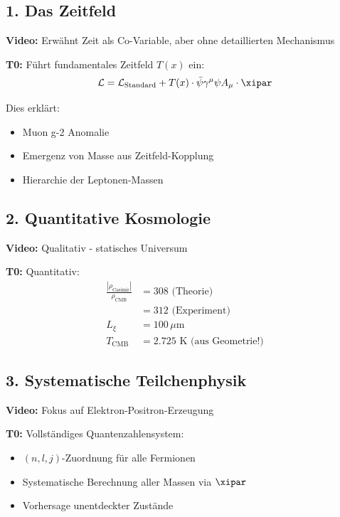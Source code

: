 	\subsection{1. Das Zeitfeld}
	
	\textbf{Video:} Erwähnt Zeit als Co-Variable, aber ohne detaillierten Mechanismus
	
	\textbf{T0:} Führt fundamentales Zeitfeld $T(x)$ ein:
	\begin{equation}
		\mathcal{L} = \mathcal{L}_{\text{Standard}} + T(x) \cdot \bar{\psi}\gamma^\mu\psi A_\mu \cdot \xipar
	\end{equation}
	
	Dies erklärt:
	\begin{itemize}
		\item Muon g-2 Anomalie
		\item Emergenz von Masse aus Zeitfeld-Kopplung
		\item Hierarchie der Leptonen-Massen
	\end{itemize}
	
	\subsection{2. Quantitative Kosmologie}
	
	\textbf{Video:} Qualitativ - statisches Universum
	
	\textbf{T0:} Quantitativ:
	\begin{align}
		\frac{|\rho_{\text{Casimir}}|}{\rho_{\text{CMB}}} &= 308 \text{ (Theorie)} \\
		&= 312 \text{ (Experiment)} \\
		L_\xi &= 100 \, \mu\text{m} \\
		T_{\text{CMB}} &= 2.725 \text{ K (aus Geometrie!)}
	\end{align}
	
	\subsection{3. Systematische Teilchenphysik}
	
	\textbf{Video:} Fokus auf Elektron-Positron-Erzeugung
	
	\textbf{T0:} Vollständiges Quantenzahlensystem:
	\begin{itemize}
		\item $(n,l,j)$-Zuordnung für alle Fermionen
		\item Systematische Berechnung aller Massen via $\xipar$
		\item Vorhersage unentdeckter Zustände
	\end{itemize}
	
